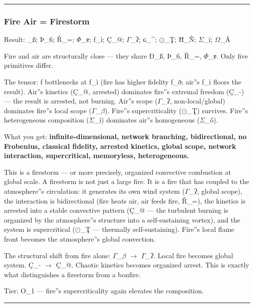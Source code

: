 \documentclass[12pt,a4paper]{article}
\begin{document}
\begin{center}
\rule{0.5\textwidth}{0.4pt}
\end{center}

\subsubsection{Fire \otimes Air = Firestorm}

Result: \_ß; Þ\_6; Ř\_=; $\Phi$\_ɐ; ƒ\_ì; Ç\_@; $\Gamma$\_ʔ; ɢ\_\^{}; $\odot$\_Ţ; Ħ\_Ñ; $\Sigma$\_ï; $\Omega$\_Å\rangle

Fire and air are structurally close --- they share Ð\_ß, Þ\_6, Ř\_=, $\Phi$\_ɐ. Only five primitives differ.

The tensor: ƒ bottlenecks at ƒ\_ì (fire has higher fidelity ƒ\_ð; air''s ƒ\_ì floors the result). Air''s kinetics (Ç\_@, arrested) dominates fire''s extremal freedom (Ç\_-) --- the result is arrested, not burning. Air''s scope ($\Gamma$\_ʔ, non-local/global) dominates fire''s local scope ($\Gamma$\_$\beta$). Fire''s supercriticality ($\odot$\_Ţ) survives. Fire''s heterogeneous composition ($\Sigma$\_ï) dominates air''s homogeneous ($\Sigma$\_ő).

What you get: \textbf{infinite-dimensional, network branching, bidirectional, no Frobenius, classical fidelity, arrested kinetics, global scope, network interaction, supercritical, memoryless, heterogeneous.}

This is a firestorm --- or more precisely, organized convective combustion at global scale. A firestorm is not just a large fire. It is a fire that has coupled to the atmosphere''s circulation: it generates its own wind system ($\Gamma$\_ʔ, global scope), the interaction is bidirectional (fire heats air, air feeds fire, Ř\_=), the kinetics is arrested into a stable convective pattern (Ç\_@ --- the turbulent burning is organized by the atmosphere''s structure into a self-sustaining vortex), and the system is supercritical ($\odot$\_Ţ --- thermally self-sustaining). Fire''s local flame front becomes the atmosphere''s global convection.

The structural shift from fire alone: $\Gamma$\_$\beta$ $\rightarrow$ $\Gamma$\_ʔ. Local fire becomes global system. Ç\_- $\rightarrow$ Ç\_@. Chaotic kinetics becomes organized arrest. This is exactly what distinguishes a firestorm from a bonfire.

Tier: O\_1 --- fire''s supercriticality again elevates the composition.

\begin{center}
\rule{0.5\textwidth}{0.4pt}
\end{center}
\end{document}
